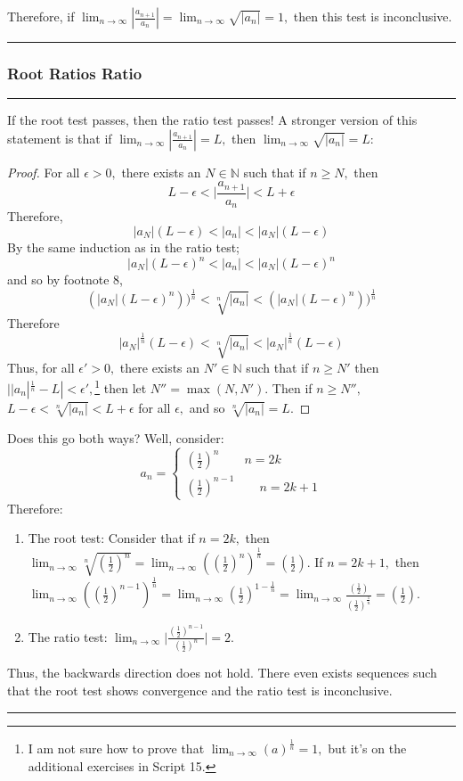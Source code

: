\documentclass[openany, amssymb, psamsfonts]{amsart}
\newcommand{\bbN}{\mathbb{N}}
\newcommand{\abs}[1]{\lvert #1 \rvert}
\theoremstyle{definition}
\numberwithin{equation}{section}
\begin{document}
Therefore, if $\displaystyle\lim_{n\to \infty}\left|\frac{a_{n+1}}{a_n}\right| = \displaystyle\lim_{n\to \infty}\sqrt{\abs{a_n}} = 1,$ then this test is inconclusive. 
\vspace{4pt}     \hrule   \vspace{4pt}
\subsubsection*{Root Ratios Ratio}
\vspace{4pt}     \hrule   \vspace{4pt}
If the root test passes, then the ratio test passes! A stronger version of this statement is that if $\displaystyle\lim_{n\to \infty}\left|\frac{a_{n+1}}{a_n}\right| = L,$ then $\displaystyle\lim_{n\to \infty}\sqrt{\abs{a_n}} = L:$
\begin{proof}
    For all $\epsilon>0,$ there exists an $N \in \bbN$ such that if $n\geq N,$ then \[L-\epsilon < \abs{\frac{a_{n+1}}{a_n}} < L + \epsilon\] Therefore, \[|a_N|(L-\epsilon) < \abs{a_{n}} < |a_N|(L-\epsilon)\] By the same induction as in the ratio test; \[|a_N|(L-\epsilon)^n < \abs{a_{n}} < |a_N|(L-\epsilon)^n\] and so by footnote 8, \[(|a_N|(L-\epsilon)^n))^\frac{1}{n} < \sqrt[n]{\abs{a_{n}}} < (|a_N|(L-\epsilon)^n))^\frac{1}{n}\] Therefore \[|a_N|^\frac{1}{n}(L-\epsilon)< \sqrt[n]{\abs{a_{n}}} < |a_N|^{\frac{1}{n}}(L-\epsilon)\] Thus, for all $\epsilon'>0,$ there exists an $N' \in \bbN$ such that if $n\geq N'$ then $||a_n|^\frac{1}{n} -L| < \epsilon',$\footnote{I am not sure how to prove that $\displaystyle\lim_{n\to \infty}(a)^\frac{1}{n} = 1,$ but it's on the additional exercises in Script 15.} then let $N'' = \max(N,N').$ Then if $n\geq N'',$ $L-\epsilon < \sqrt[n]{\abs{a_{n}}} < L + \epsilon$ for all $\epsilon,$ and so $\sqrt[n]{\abs{a_{n}}} = L.$
\end{proof}
Does this go both ways? Well, consider:
\[a_n = \begin{cases}
    (\frac{1}{2})^n \qquad n = 2k\\
    (\frac{1}{2})^{n-1} \qquad n = 2k+1
\end{cases}\]
Therefore:
\begin{enumerate}
    \item The root test: Consider that if $n = 2k,$ then $\displaystyle\lim_{n\to \infty}\sqrt[n]{(\frac{1}{2})^n} = \displaystyle\lim_{n\to \infty}((\frac{1}{2})^{n})^{\frac{1}{n}} = (\frac{1}{2}).$ If $n = 2k+1,$ then $\displaystyle\lim_{n\to \infty}((\frac{1}{2})^{n-1})^{\frac{1}{n}} = \displaystyle\lim_{n\to \infty}(\frac{1}{2})^{1 - \frac{1}{n}}=  \displaystyle\lim_{n\to \infty}\frac{(\frac{1}{2})}{(\frac{1}{2})^{\frac{1}{n}}} = (\frac{1}{2}).$
    \item The ratio test: $\displaystyle\lim_{n\to \infty}\abs{\frac{(\frac{1}{2})^{n-1}}{(\frac{1}{2})^{n}}} = 2.$
\end{enumerate}
Thus, the backwards direction does not hold. There even exists sequences such that the root test shows convergence and the ratio test is inconclusive. 
\vspace{4pt}     \hrule   \vspace{4pt}
\end{document}
